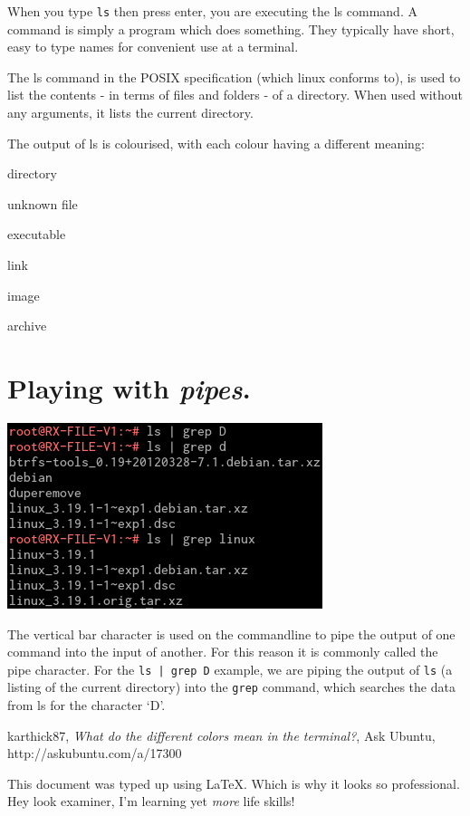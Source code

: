 \documentclass[11pt,twoside,a4paper]{article}
\begin{document}
When you type \verb|ls| then press enter, you are executing the ls command. A command is simply a program which does something. They typically have short, easy to type names for convenient use at a terminal.

The ls command in the POSIX specification (which linux conforms to), is used to list the contents - in terms of files and folders - of a directory. When used without any arguments, it lists the current directory.

\pagebreak
The output of ls is colourised, with each colour having a different meaning:\cite{ls-colours}
\begin{description}[leftmargin=!,labelwidth=\widthof{\bfseries Light Blue}]
  \item[Blue] directory
  \item[White] unknown file
  \item[Green] executable
  \item[Light Blue] link
  \item[Pink] image
  \item[Red] archive
\end{description}

\section{Playing with \emph{pipes}.}

\includegraphics{ls-grep}

The vertical bar character is used on the commandline to pipe the output of one command into the input of another. For this reason it is commonly called the pipe character. For the \verb!ls | grep D! example, we are piping the output of \verb|ls| (a listing of the current directory) into the \verb|grep| command, which searches the data from ls for the character `D'.

\newpage
\begin{thebibliography}{9}

  karthick87,
  \emph{What do the different colors mean in the terminal?},
  Ask Ubuntu,
  http://askubuntu.com/a/17300

\end{thebibliography}

\vfill
This document was typed up using \LaTeX. Which is why it looks so professional. Hey look examiner, I'm learning yet \emph{more} life skills!
\end{document}
